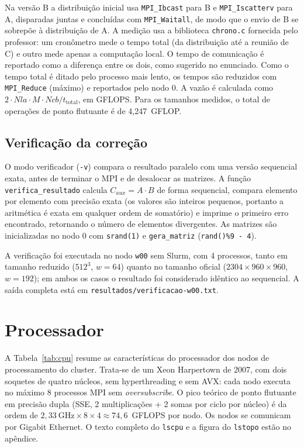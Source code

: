 \documentclass[conference]{IEEEtran}
\begin{document}
Na versão B a distribuição inicial usa \texttt{MPI\_Ibcast} para B e
\texttt{MPI\_Iscatterv} para A, disparadas juntas e concluídas com
\texttt{MPI\_Waitall}, de modo que o envio de B se sobrepõe à distribuição
de A. A medição usa a biblioteca \texttt{chrono.c} fornecida pelo professor:
um cronômetro mede o tempo total (da distribuição até a reunião de C) e
outro mede apenas a computação local. O tempo de comunicação é reportado
como a diferença entre os dois, como sugerido no enunciado. Como o tempo
total é ditado pelo processo mais lento, os tempos são reduzidos com
\texttt{MPI\_Reduce} (máximo) e reportados pelo nodo 0. A vazão é calculada
como $2 \cdot Nla \cdot M \cdot Ncb / t_{\text{total}}$, em GFLOPS. Para os
tamanhos medidos, o total de operações de ponto flutuante é de 4,247~GFLOP.

\subsection{Verificação da correção}

O modo verificador (\texttt{-v}) compara o resultado paralelo com uma versão
sequencial exata, antes de terminar o MPI e de desalocar as matrizes. A
função \texttt{verifica\_resultado} calcula $C_{aux} = A \cdot B$ de forma
sequencial, compara elemento por elemento com precisão exata (os valores são
inteiros pequenos, portanto a aritmética é exata em qualquer ordem de
somatório) e imprime o primeiro erro encontrado, retornando o número de
elementos divergentes. As matrizes são inicializadas no nodo 0 com
\texttt{srand(1)} e \texttt{gera\_matriz} (\texttt{rand()\%9 - 4}).

A verificação foi executada no nodo \texttt{w00} sem Slurm, com 4 processos,
tanto em tamanho reduzido ($512^3$, $w=64$) quanto no tamanho oficial
($2304 \times 960 \times 960$, $w=192$); em ambos os casos o resultado foi
considerado idêntico ao sequencial. A saída completa está em
\texttt{resultados/verificacao-w00.txt}.

\section{Processador}

A Tabela~\ref{tab:cpu} resume as características do processador dos nodos de
processamento do cluster. Trata-se de um Xeon Harpertown de 2007, com dois
soquetes de quatro núcleos, sem hyperthreading e sem AVX: cada nodo executa
no máximo 8 processos MPI sem \emph{oversubscribe}. O pico teórico de ponto
flutuante em precisão dupla (SSE, 2 multiplicações + 2 somas por ciclo por
núcleo) é da ordem de $2{,}33~\text{GHz} \times 8 \times 4 \approx
74{,}6$~GFLOPS por nodo. Os nodos se comunicam por Gigabit Ethernet. O texto
completo do \texttt{lscpu} e a figura do \texttt{lstopo} estão no apêndice.
\end{document}
